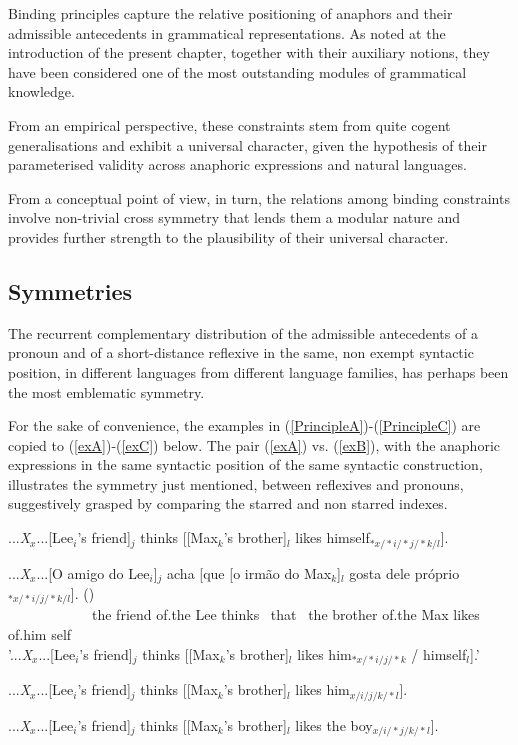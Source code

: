 \documentclass[output=paper
,modfonts
,nonflat]{langsci/langscibook}
\begin{document}
Binding principles capture the relative positioning of anaphors and their 
admissible antecedents in grammatical representations. As noted at the introduction of the present chapter, together with their auxiliary notions, they have been considered one of the most outstanding modules 
of grammatical knowledge.

From an empirical perspective, these constraints stem from quite cogent generalisations and exhibit a universal
character, given the hypothesis of their parameterised validity across anaphoric expressions and natural languages.

From a conceptual point of view, in turn, the relations among binding
constraints involve non-trivial cross symmetry that lends them a modular nature
and provides further strength to the plausibility of their universal character.

\subsection{Symmetries}

The recurrent complementary distribution of the admissible antecedents
of a pronoun and of a short-distance reflexive in the same, non exempt
syntactic position, in different languages from different language families,
has perhaps been the most emblematic symmetry. 

For the sake of convenience,
the examples in (\ref{PrincipleA})-(\ref{PrincipleC}) are copied
to (\ref{exA})-(\ref{exC}) below. The pair (\ref{exA}) vs. (\ref{exB}), with the anaphoric expressions
in the same syntactic position of the same syntactic construction, illustrates
the symmetry just mentioned, between reflexives and pronouns, suggestively grasped by comparing the starred 
and non starred indexes.


\begin{exe}
\ex
\label{exA}
{...{\em X}$_{x}$...[Lee$_{i}$'s friend]$_{j}$ thinks
[[Max$_{k}$'s brother]$_{l}$ likes %
himself$_{*x/*i/*j/*k/l}$].}

\ex
\label{exZ}
\gll ...{\em X}$_{x}$...[O amigo do Lee$_{i}$]$_{j}$ acha [que [o
irm\~{a}o do Max$_{k}$]$_{l}$ gosta dele pr\'{o}prio$_{*x/*i/j/*k/l}$]. ()\\ \mbox{ }\mbox{ }\mbox{ }\mbox{ }\mbox{ }\mbox{ }\mbox{ }\mbox{ }\mbox{ }\mbox{ }\mbox{ }\mbox{ }the friend of.the Lee thinks \mbox{ }that \mbox{ }the brother of.the Max likes of.him self\\
\trans '...{\em X}$_{x}$...[Lee$_{i}$'s friend]$_{j}$ thinks [[Max$_{k}$'s brother]$_{l}$
likes him$_{*x/*i/j/*k}$ / \linebreak
himself$_{l}$].'

\ex
\label{exB}
{...{\em X}$_{x}$...[Lee$_{i}$'s friend]$_{j}$ thinks [[Max$_{k}$'s brother]$_{l}$
likes %
 him$_{x/i/j/k/*l}$].}

\ex
\label{exC}
{...{\em X}$_{x}$...[Lee$_{i}$'s friend]$_{j}$ thinks [[Max$_{k}$'s brother]$_{l}$
likes %
the boy$_{x/i/*j/k/*l}$].}
\end{exe}
\end{document}
